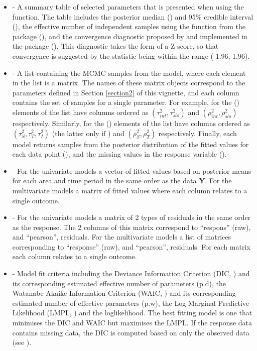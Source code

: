 \documentclass[article, nojss]{jss}
\begin{document}
\begin{itemize}
\item {} - A summary table of selected parameters that is presented when using the  function. The table includes the posterior median () and 95$\%$ credible interval (),  the effective number of independent samples using the   function from the  package (), and the convergence  diagnostic proposed by \cite{geweke1992} and implemented in the  package (). This diagnostic takes the form of a Z-score, so that convergence is suggested by the statistic being within the range (-1.96, 1.96).

\item {} - A list containing the MCMC samples from the model, where each element in the list is a matrix. The names of these matrix objects correspond to the parameters defined in Section \ref{section2} of this vignette, and each column contains the set of samples for a single parameter.  For example, for  the () elements of the list have columns ordered as $(\tau^2_{int}, \tau^2_{slo})$ and $(\rho^2_{int}, \rho^2_{slo})$ respectively. Similarly, for   the () elements of the list have columns ordered as $(\tau^2_{S}, \tau^2_{T}, \tau^2_{I})$ (the latter only if ) and $(\rho^2_{S}, \rho^2_{T})$ respectively. Finally, each model returns samples from the posterior distribution of the fitted values for each data point (), and the missing values in the response variable ().

\item {} - For the univariate models a vector of fitted values based on posterior means for each area and time period in the same order as the data $\mathbf{Y}$. For the multivariate models a matrix of fitted values where each column relates to a single outcome. 

\item {} - For the univariate models a matrix of 2 types of residuals in the same order as the response. The 2 columns of this matrix correspond to ``respons'' (raw), and ``pearson'', residuals. For the multivariate models a list of matrices corresponding to  ``response'' (raw), and ``pearson'', residuals. For each matrix each column relates to a single outcome. 

\item {} - Model fit criteria including the Deviance Information Criterion (DIC, \citealp{spiegelhalter2002}) and its corresponding estimated effective number of parameters (p.d), the Watanabe-Akaike Information Criterion (WAIC, \citealp{watanabe2010}) and its corresponding estimated number of effective parameters (p.w), the Log Marginal Predictive Likelihood (LMPL, \citealp{congdon2005}) and the loglikelihood. The best fitting model is one that minimises the DIC and WAIC but maximises the LMPL. If the response data contains missing data, the DIC is computed based on only the observed data (see \cite{celeux2006}).


\end{itemize}
\end{document}

